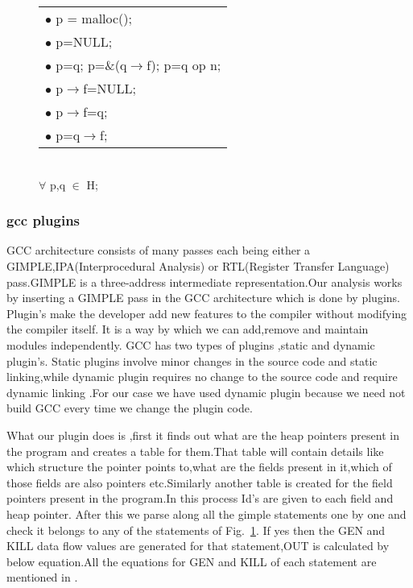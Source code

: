 \documentclass[11pt]{article}
\begin{document}
\begin{figure}[h] 
\begin{tabular}[b]{l}
        $\bullet$  p = malloc(); \\
        $\bullet$  p=NULL; \\
        $\bullet$  p=q; p=\&(q$\rightarrow$f); p=q op n; \\
        $\bullet$  p$\rightarrow$f=NULL; \\
        $\bullet$  p$\rightarrow$f=q; \\
        $\bullet$  p=q$\rightarrow$f; \\
\end{tabular}
\\
$\forall$ p,q $\in$ H;

\caption{\label{fig:stmts}}
\end{figure}


  \subsubsection[]{gcc plugins}
      GCC architecture consists of many passes each being either a GIMPLE,IPA(Interprocedural Analysis) or RTL(Register 
Transfer Language) pass.GIMPLE is a three-address intermediate representation.Our analysis works by inserting a
GIMPLE pass in the GCC architecture which is done by plugins. \\	  
      Plugin's make the developer add new features to the compiler without modifying the compiler itself.
It is a way by which we can add,remove and maintain modules independently.
GCC has two types of plugins ,static and dynamic plugin's. 
Static plugins involve minor changes in the source code and static linking,while dynamic plugin requires
no change to the source code and require dynamic linking \cite{plugin} .For our case we have used dynamic plugin 
because we need not build GCC every time we change the plugin code.

   What our plugin does is ,first it finds out what are the heap pointers present in the program and creates a table for
them.That table will contain details like which structure the pointer points to,what are the fields present
in it,which of those fields are also pointers etc.Similarly another table is created for the field pointers
present in the program.In this process Id's are given to each field and heap pointer.
After this we parse along all the gimple statements one by one and check it belongs to any of the statements of Fig.~\ref{fig:stmts}.
 If yes then the GEN and KILL data flow values are generated for that statement,OUT is calculated by below equation.All the
equations for GEN and KILL of each statement are mentioned in \cite{Sandeep}.\\
\end{document}

